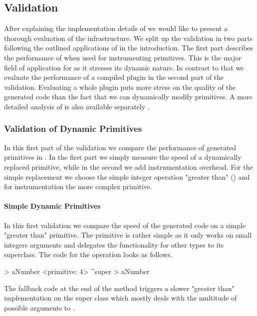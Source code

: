 \subsection{\WF Validation}
After explaining the implementation details of \WF we would like to present a thorough evaluation of the \WF infrastructure.
We split up the validation in two parts following the outlined applications of \WF in the introduction.
The first part describes the performance of \WF when used for instrumenting primitives.
This is the major field of application for \WF as it stresses its dynamic nature.
In contrast to that we evaluate the performance of a \WF compiled plugin in the second part of the validation.
Evaluating a whole plugin puts more stress on the quality of the generated code than the fact that we can dynamically modify primitives.
A more detailed analysis of \WF is also available separately \cite{Char13a}.


\subsubsection*{Validation of Dynamic Primitives}

In this first part of the \WF validation we compare the performance of \WF generated primitives in \PH.
In the first part we simply measure the speed of a dynamically replaced primitive, while in the second we add instrumentation overhead.
For the simple replacement we choose the simple integer operation "greater than" (\ttt{$>$}) and for instrumentation the more complex  primitive.

\paragraph{Simple Dynamic Primitives}
In this first validation we compare the speed of the \WF generated code on a simple "greater than" primitive.
The primitive is rather simple as it only works on small integers arguments and delegates the functionality for other types to its superclass.
The code for the  operation looks as follows.
%
\begin{stcode}{3}
> aNumber
	<primitive: 4>
	^super > aNumber
\end{stcode}
%
The fallback code at the end of the method triggers a slower "greater than" implementation on the super class  which mostly deals with the multitude of possible arguments to \ttt{>}.

